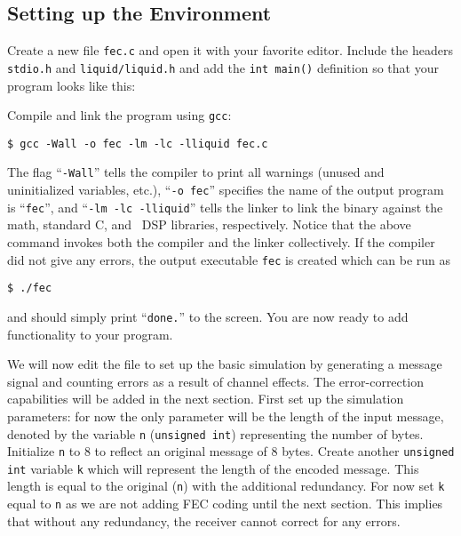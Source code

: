 \subsection{Setting up the Environment}
\label{tutorial:fec:environment}

Create a new file {\tt fec.c} and open it with your favorite editor.
Include the headers {\tt stdio.h} and {\tt liquid/liquid.h}
and add the {\tt int main()} definition
so that your program looks like this:
%

%
Compile and link the program using {\tt gcc}:
%
\begin{Verbatim}[fontsize=\small]
    $ gcc -Wall -o fec -lm -lc -lliquid fec.c
\end{Verbatim}
%
The flag ``{\tt -Wall}'' tells the compiler to print all warnings
(unused and uninitialized variables, etc.),
``{\tt -o fec}'' specifies the name of the output program is
``{\tt fec}'', and
``{\tt -lm -lc -lliquid}'' tells the linker to link the binary against
the math, standard C, and \liquid\ DSP libraries, respectively.
Notice that the above command invokes both the compiler and the linker
collectively.
%
If the compiler did not give any errors, the output executable {\tt fec}
is created which can be run as
%
\begin{Verbatim}[fontsize=\small]
    $ ./fec
\end{Verbatim}
%
and should simply print ``{\tt done.}'' to the screen.
You are now ready to add functionality to your program.

We will now edit the file to set up the basic simulation by generating a
message signal and counting errors as a result of channel effects.
The error-correction capabilities will be added in the next section.
First set up the simulation parameters: for now the only parameter will
be the length of the input message, denoted by the variable {\tt n}
({\tt unsigned int}) representing the number of bytes.
Initialize {\tt n} to 8 to reflect an original message of 8 bytes.
Create another {\tt unsigned int} variable {\tt k} which will represent
the length of the encoded message.
This length is equal to the original ({\tt n}) with the additional
redundancy.
For now set {\tt k} equal to {\tt n} as we are not adding FEC coding
until the next section.
This implies that without any redundancy, the receiver cannot correct
for any errors.

